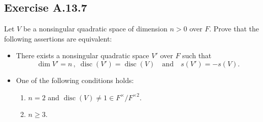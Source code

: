 \documentclass[12pt, a4paper]{article}
\begin{document}
\subsection*{Exercise A.13.7}
Let $V$ be a nonsingular quadratic space of dimension $n > 0$ over $F$. Prove that the following assertions are equivalent:
\begin{itemize}
    \item[(i)] There exists a nonsingular quadratic space $V'$ over $F$ such that
    \[ \dim V' = n \,,\; \operatorname{disc}(V') = \operatorname{disc}(V) \quad \text{and} \quad s(V') = -s(V). \]
    \item[(ii)] One of the following conditions holds:
    \begin{enumerate}
        \item $n = 2$ and $\operatorname{disc}(V) \neq 1 \in F^\times / F^{\times 2}$.
        \item $n \ge 3$.
    \end{enumerate}
\end{itemize}
\end{document}
